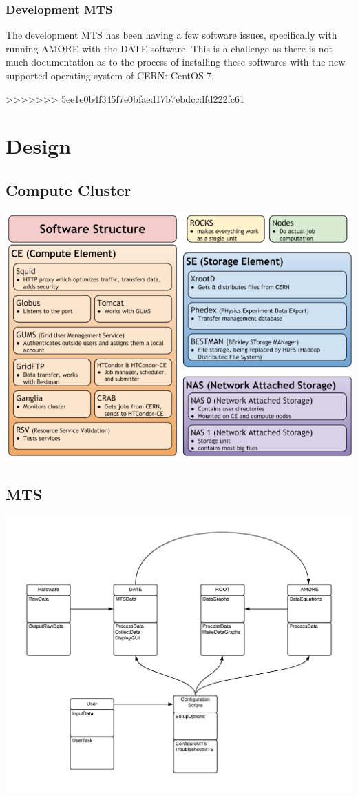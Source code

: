 \documentclass[12pt]{article}
\newcommand\tab[1][1cm]{\hspace*{#1}}
\begin{document}
\subsubsection{Development MTS}
\tab The development MTS has been having a few software issues, specifically with running AMORE with the DATE software. This is a challenge as there is not much documentation as to the process of installing these softwares with the new supported operating system of CERN: CentOS 7.
 
>>>>>>> 5ee1e0b4f345f7e0bfaed17b7ebdccdfd222fc61
\section{Design}
\subsection{Compute Cluster}
\includegraphics{Cluster_Design_Image.png}
\subsection{MTS}
\includegraphics[scale=.75]{image3.png}
\end{document}
